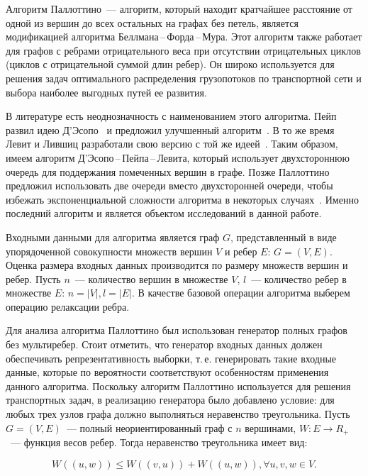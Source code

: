 \documentclass[a4paper, article, 14pt]{extarticle}
\begin{document}
Алгоритм Паллоттино~--- алгоритм, который находит кратчайшее расстояние от одной из вершин до всех остальных на графах без петель, является модификацией алгоритма Беллмана\,--\,Форда\,--\,Мура. Этот алгоритм также работает для графов с ребрами отрицательного веса при отсутствии отрицательных циклов (циклов с отрицательной суммой длин ребер). Он широко используется для решения задач оптимального распределения грузопотоков по транспортной сети и выбора наиболее выгодных путей ее развития.

В литературе есть неоднозначность с наименованием этого алгоритма. Пейп развил идею Д'Эсопо~\cite{desopo} и предложил улучшенный алгоритм~\cite{pape}. В то же время Левит и Лившиц разработали свою версию с той же идеей~\cite{levit_livshits}. Таким образом, имеем алгоритм Д'Эсопо\,--\,Пейпа\,--\,Левита, который использует двухстороннюю очередь для поддержания помеченных вершин в графе. Позже Паллоттино предложил использовать две очереди вместо двухсторонней очереди, чтобы избежать экспоненциальной сложности алгоритма в некоторых случаях~\cite{pallottino}. Именно последний алгоритм и является объектом исследований в данной работе.

Входными данными для алгоритма является граф $G$, представленный в виде упорядоченной совокупности множеств вершин $V$ и ребер $E$: $G = (V, E)$. Оценка размера входных данных производится по размеру множеств вершин и ребер. Пусть $n$~--- количество вершин в множестве $V$, $l$~--- количество ребер в множестве $E$: $n = |V|, l = |E|$. В качестве базовой операции алгоритма выберем операцию релаксации ребра.

Для анализа алгоритма Паллоттино был использован генератор полных графов без мультиребер. Стоит отметить, что генератор входных данных должен обеспечивать репрезентативность выборки, т.\,е. генерировать такие входные данные, которые по вероятности соответствуют особенностям применения данного алгоритма. Поскольку алгоритм Паллоттино используется для решения транспортных задач, в реализацию генератора было добавлено условие: для любых трех узлов графа должно выполняться неравенство треугольника. Пусть $G = (V, E)$~--- полный неориентированный граф с $n$ вершинами, $W: E \rightarrow R_+$~--- функция весов ребер. Тогда неравенство треугольника имеет вид:

\begin{equation}\label{eq:triangle_inequality}
	W((u, w)) \leq W((v, u)) + W((u, w)), \forall u, v, w \in V.
\end{equation}
\end{document}
